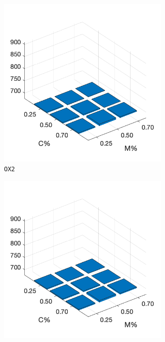 \begin{figure}
%
	\begin{subfigure}[b]{0.25\textwidth}
		\centering
		\includegraphics[width=0.9\textwidth]{crossover/cross_unnamed_1.png}
		\caption{\texttt{OX2}}
		\label{fig:x}
    	\end{subfigure}
%
	\begin{subfigure}[b]{0.25\textwidth}
		\centering
		\includegraphics[width=0.9\textwidth]{crossover/cross_unnamed_1.png}

\end{subfigure}
\end{figure}
